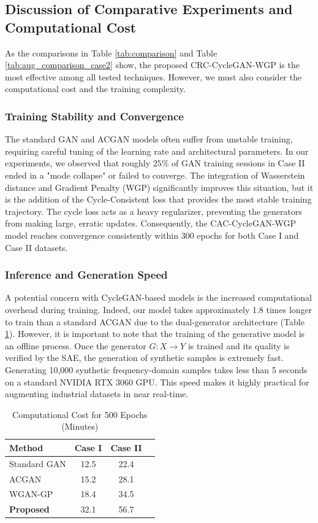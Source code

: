 \subsection{Discussion of Comparative Experiments and Computational Cost}
As the comparisons in Table \ref{tab:comparison} and Table \ref{tab:aug_comparison_case2} show, the proposed CRC-CycleGAN-WGP is the most effective among all tested techniques. However, we must also consider the computational cost and the training complexity.

\subsubsection{Training Stability and Convergence}
The standard GAN and ACGAN models often suffer from unstable training, requiring careful tuning of the learning rate and architectural parameters. In our experiments, we observed that roughly $25\%$ of GAN training sessions in Case II ended in a "mode collapse" or failed to converge. The integration of Wasserstein distance and Gradient Penalty (WGP) significantly improves this situation, but it is the addition of the Cycle-Consistent loss that provides the most stable training trajectory. The cycle loss acts as a heavy regularizer, preventing the generators from making large, erratic updates. Consequently, the CAC-CycleGAN-WGP model reaches convergence consistently within 300 epochs for both Case I and Case II datasets.

\subsubsection{Inference and Generation Speed}
A potential concern with CycleGAN-based models is the increased computational overhead during training. Indeed, our model takes approximately 1.8 times longer to train than a standard ACGAN due to the dual-generator architecture (Table \ref{tab:comp_cost}). However, it is important to note that the training of the generative model is an offline process. Once the generator $G: X \to Y$ is trained and its quality is verified by the SAE, the generation of synthetic samples is extremely fast. Generating 10,000 synthetic frequency-domain samples takes less than 5 seconds on a standard NVIDIA RTX 3060 GPU. This speed makes it highly practical for augmenting industrial datasets in near real-time.

\begin{table}[htbp]
\centering
\caption{Computational Cost for 500 Epochs (Minutes)}
\label{tab:comp_cost}
\begin{tabular}{lccc}
\hline
\textbf{Method} & \textbf{Case I} & \textbf{Case II} \\ \hline
Standard GAN & 12.5 & 22.4 \\
ACGAN & 15.2 & 28.1 \\
WGAN-GP & 18.4 & 34.5 \\
\textbf{Proposed} & 32.1 & 56.7 \\
\hline
\end{tabular}
\end{table}

